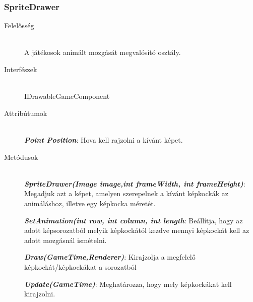 \subsubsection{SpriteDrawer}
	\begin{description}
		\item[Felelősség] \hfill \\
		A játékosok animált mozgását megvalósító osztály.
		\item[Interfészek] \hfill \\
		IDrawableGameComponent
		\item[Attribútumok] \hfill \\
		\textbf{\emph{Point Position}}: Hova kell rajzolni a kívánt képet.

		\item[Metódusok] \hfill \\
		\textbf{\emph{SpriteDrawer(Image image,int frameWidth, int frameHeight)}}: Megadjuk azt a képet, amelyen szerepelnek a kívánt képkockák az animáláshoz, illetve egy képkocka méretét.

		\textbf{\emph{SetAnimation(int row, int column, int length}}: Beállítja, hogy az adott képsorozatból melyik képkockától kezdve mennyi képkockát kell az adott mozgásnál ismételni.

		\textbf{\emph{Draw(GameTime,Renderer)}}: Kirajzolja a megfelelő képkockát/képkockákat a sorozatból

		\textbf{\emph{Update(GameTime)}}: Meghatározza, hogy mely képkockákat kell kirajzolni.
		
	\end{description}
	
